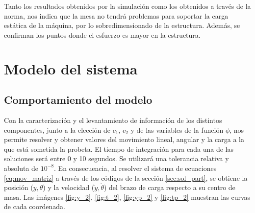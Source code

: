 Tanto los resultados obtenidos por la simulación como los obtenidos a través de la norma, nos indica que la mesa no tendrá problemas para soportar la carga estática de la máquina, por lo sobredimensionado de la estructura. Además, se confirman los puntos donde el esfuerzo es mayor en la estructura.

\section{Modelo del sistema}

\subsection{Comportamiento del modelo}
Con la caracterización y el levantamiento de información de los distintos componentes, junto a la elección de $c_1$, $c_2$ y de las variables de la función $\phi$, nos permite resolver y obtener valores del movimiento lineal, angular y la carga a la que está sometida la probeta. El tiempo de integración para cada una de las soluciones será entre 0 y 10 segundos. Se utilizará una tolerancia relativa y absoluta de $10^{-8}$. En consecuencia, al resolver el sistema de ecuaciones \ref{eq:mov_matriz} a través de los códigos de la sección \ref{sec:sol_part}, se obtiene la posición ($y,\theta$) y la velocidad ($\dot{y},\dot{\theta}$) del brazo de carga respecto a su centro de masa. Las imágenes \ref{fig:y_2}, \ref{fig:t_2}, \ref{fig:yp_2} y \ref{fig:tp_2} muestran las curvas de cada coordenada.

